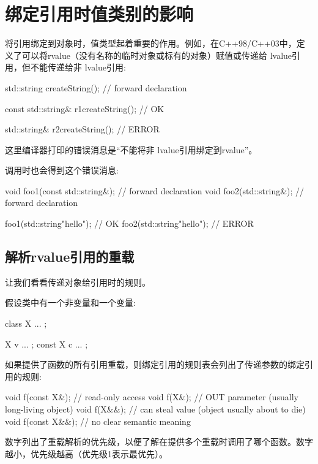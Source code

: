\section{绑定引用时值类别的影响}
将引用绑定到对象时，值类型起着重要的作用。例如，在C++98/C++03中，定义了可以将rvalue（没有名称的临时对象或标有的对象）赋值或传递给 lvalue引用，但不能传递给非 lvalue引用:

\begin{cppcode}
std::string createString(); // forward declaration

const std::string& r1{createString()}; // OK

std::string& r2{createString()}; // ERROR
\end{cppcode}

这里编译器打印的错误消息是“不能将非 lvalue引用绑定到rvalue”。

调用时也会得到这个错误消息:

\begin{cppcode}
void foo1(const std::string&); // forward declaration
void foo2(std::string&); // forward declaration

foo1(std::string{"hello"}); // OK
foo2(std::string{"hello"}); // ERROR
\end{cppcode}

\subsection{解析rvalue引用的重载}

让我们看看传递对象给引用时的规则。

假设类中有一个非变量和一个变量:

\begin{cppcode}
class X {
	...
};

X v{ ... };
const X c{ ... };
\end{cppcode}

如果提供了函数的所有引用重载，则绑定引用的规则表会列出了传递参数的绑定引用的规则:

\begin{cppcode}
void f(const X&); // read-only access
void f(X&); // OUT parameter (usually long-living object)
void f(X&&); // can steal value (object usually about to die)
void f(const X&&); // no clear semantic meaning
\end{cppcode}

数字列出了重载解析的优先级，以便了解在提供多个重载时调用了哪个函数。数字越小，优先级越高（优先级1表示最优先）。

